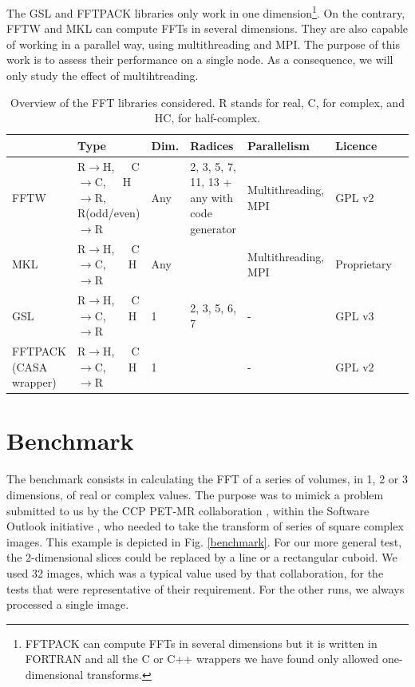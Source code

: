 \documentclass[12pt, a4paper]{article}
\begin{document}
The GSL and FFTPACK libraries only work in one dimension\footnote{FFTPACK can compute FFTs in several dimensions but it is written in FORTRAN and all the C or C++ wrappers we have found only allowed one-dimensional transforms.}. On the contrary, FFTW and MKL can compute FFTs in several dimensions. They are also capable of working in a parallel way, using multithreading and MPI. The purpose of this work is to assess their performance on a single node. As a consequence, we will only study the effect of multihtreading. 
\begin{table}[H]
\captionsetup{width=1\textwidth}
\begin{tabular}{|p{2.5cm}||p{2.5cm}|p{1cm}|p{3cm}|p{3cm}|p{2cm}|p{2cm}|}
\hline
& Type & Dim. & Radices & Parallelism & Licence \\
\hline
\hline
FFTW & R$\to$H,\ \ \  C$\to$C,\ \ \  H$\to$R, R{\scriptsize (odd/even)}$\to$R& Any&2, 3, 5, 7, 11, 13 + any with code generator & Multithreading, MPI & GPL v2\\
\hline
MKL  &  R$\to$H,\ \ \  C$\to$C,\ \ \ \  H$\to$R& Any & & Multithreading, MPI & Proprietary\\
\hline
GSL  &  R$\to$H,\ \ \  C$\to$C,\ \ \ \  H$\to$R & 1 & 2, 3, 5, 6, 7 & - & GPL v3\\
\hline
FFTPACK {\scriptsize (CASA wrapper)} &  R$\to$H,\ \ \  C$\to$C,\ \ \ \  H$\to$R & 1 & & - & GPL v2\\
\hline
\end{tabular}
\caption{Overview of the FFT libraries considered. R stands for real, C, for complex, and HC, for half-complex.}
\label{ffttable}
\end{table}
\section{Benchmark}
The benchmark \cite{code} consists in calculating the FFT of a series of volumes, in 1, 2 or 3 dimensions, of real or complex values. The purpose was to mimick a problem submitted to us by the CCP PET-MR collaboration \cite{ccppetmr}, within the Software Outlook initiative \cite{softwareoutlook}, who needed to take the transform of series of square complex images. This example is depicted in Fig. \ref{benchmark}. For our more general test, the 2-dimensional slices could be replaced by a line or a rectangular cuboid. We used 32 images, which was a typical value used by that collaboration, for the tests that were representative of their requirement. For the other runs, we always processed a single image.\\
\end{document}
